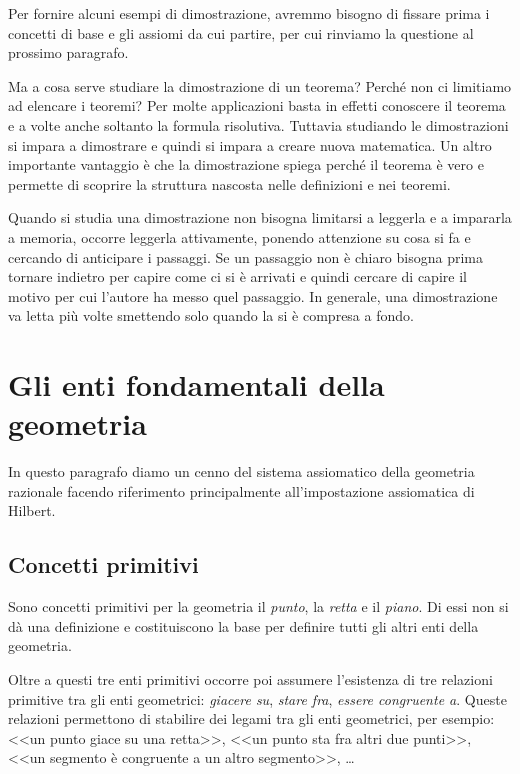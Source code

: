 Per fornire alcuni esempi di dimostrazione, avremmo bisogno di 
fissare prima i concetti di base e gli assiomi da cui partire, per 
cui rinviamo la questione al prossimo paragrafo.

Ma a cosa serve studiare la dimostrazione di un teorema? Perché non 
ci limitiamo ad elencare i teoremi? Per molte applicazioni basta in 
effetti conoscere il teorema e a volte anche soltanto la formula 
risolutiva. Tuttavia studiando le dimostrazioni si impara a 
dimostrare e quindi si impara a creare nuova matematica. Un altro 
importante vantaggio è che la dimostrazione spiega perché il teorema 
è vero e permette di scoprire la struttura nascosta nelle definizioni 
e nei teoremi.

Quando si studia una dimostrazione non bisogna limitarsi a leggerla e 
a impararla a memoria, occorre leggerla attivamente, ponendo 
attenzione su cosa si fa e cercando di anticipare i passaggi. Se un 
passaggio non è chiaro bisogna prima tornare indietro per capire come 
ci si è arrivati e quindi cercare di capire il motivo per cui 
l'autore ha messo quel passaggio. In generale, una dimostrazione va 
letta più volte smettendo solo quando la si è compresa a fondo.

\vspazio\ovalbox{\risolvii \ref{ese:1.35}, \ref{ese:1.18}}

\section{Gli enti fondamentali della 
geometria}\label{sect:enti_fondamentali}

In questo paragrafo diamo un cenno del sistema assiomatico della 
geometria razionale facendo riferimento principalmente 
all'impostazione assiomatica di Hilbert.

\subsection{Concetti primitivi}

Sono concetti primitivi per la geometria il \emph{punto}, la 
\emph{retta} e il \emph{piano}. Di essi non si dà una definizione e 
costituiscono la base per definire tutti gli altri enti della 
geometria.

Oltre a questi tre enti primitivi occorre poi assumere l'esistenza di 
tre relazioni primitive tra gli enti geometrici: \emph{giacere su}, 
\emph{stare fra}, \emph{essere congruente a}. Queste relazioni 
permettono di stabilire dei legami tra gli enti geometrici, per 
esempio: <<un punto giace su una retta>>, <<un punto sta fra altri 
due punti>>, <<un segmento è congruente a un altro segmento>>, \ldots

